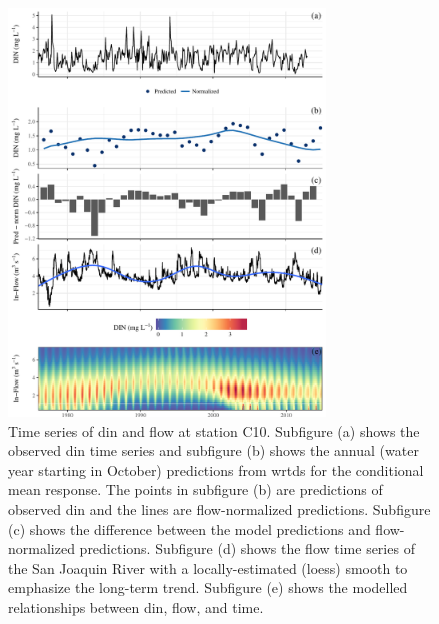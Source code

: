 \documentclass[journal = esthag, manuscript = article]{achemso}\usepackage[]{graphicx}\usepackage[]{color}
\begin{document}
\begin{figure}[!ht]

{\centering \includegraphics[width=0.75\textwidth]{figs/dinc10-1} 

}

\caption{Time series of \ac{din} and flow at station C10.  Subfigure (a) shows the observed \ac{din} time series and subfigure (b) shows the annual (water year starting in October) predictions from \ac{wrtds} for the conditional mean response.  The points in subfigure (b) are predictions of observed \ac{din} and the lines are flow-normalized predictions.  Subfigure (c) shows the difference between the model predictions and flow-normalized predictions.  Subfigure (d) shows the flow time series of the San Joaquin River with a locally-estimated (loess) smooth to emphasize the long-term trend. Subfigure (e) shows the modelled relationships between \ac{din}, flow, and time.}\label{fig:dinc10}
\end{figure}
\end{document}
